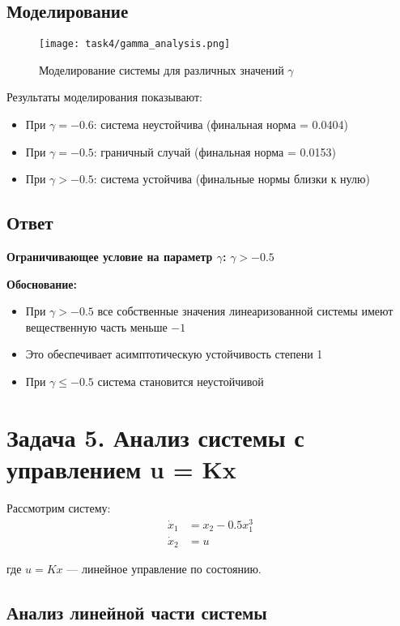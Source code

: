 \subsection*{Моделирование}

\begin{figure}[H]
\centering
\texttt{[image: task4/gamma\_analysis.png]}
\caption{Моделирование системы для различных значений $\gamma$}
\label{fig:gamma_analysis}
\end{figure}

Результаты моделирования показывают:
\begin{itemize}
\item При $\gamma = -0.6$: система неустойчива (финальная норма = 0.0404)
\item При $\gamma = -0.5$: граничный случай (финальная норма = 0.0153)
\item При $\gamma > -0.5$: система устойчива (финальные нормы близки к нулю)
\end{itemize}

\subsection*{Ответ}

\textbf{Ограничивающее условие на параметр $\gamma$:} $\gamma > -0.5$

\textbf{Обоснование:}
\begin{itemize}
\item При $\gamma > -0.5$ все собственные значения линеаризованной системы имеют вещественную часть меньше $-1$
\item Это обеспечивает асимптотическую устойчивость степени 1
\item При $\gamma \leq -0.5$ система становится неустойчивой
\end{itemize}

\section*{Задача 5. Анализ системы с управлением u = Kx}

Рассмотрим систему:
\begin{align}
\dot{x}_1 &= x_2 - 0.5x_1^3 \\
\dot{x}_2 &= u
\end{align}

где $u = Kx$ — линейное управление по состоянию.

\subsection*{Анализ линейной части системы}


